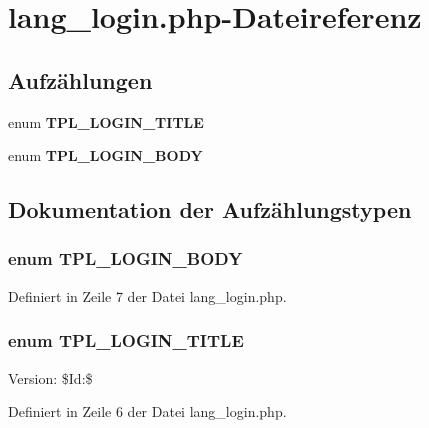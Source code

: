 \section{lang\_\-login.php-Dateireferenz}
\label{lang__login_8php}
\subsection*{Aufzählungen}
\begin{CompactItemize}
\item 
enum {\bf TPL\_\-LOGIN\_\-TITLE} 
\item 
enum {\bf TPL\_\-LOGIN\_\-BODY} 
\end{CompactItemize}


\subsection{Dokumentation der Aufzählungstypen}
\subsubsection{\setlength{\rightskip}{0pt plus 5cm}enum {\bf TPL\_\-LOGIN\_\-BODY}}\label{lang__login_8php_e69258fe5b10c672c458920862066419}




Definiert in Zeile 7 der Datei lang\_\-login.php.
\subsubsection{\setlength{\rightskip}{0pt plus 5cm}enum {\bf TPL\_\-LOGIN\_\-TITLE}}\label{lang__login_8php_7c3f15c19405c454943798c1e3cdbf65}


\begin{Desc}
\item[Version:]\$Id:\$ \end{Desc}


Definiert in Zeile 6 der Datei lang\_\-login.php.